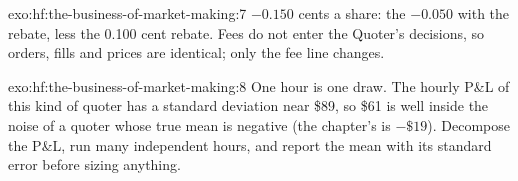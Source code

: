 \begin{solution}{exo:hf:the-business-of-market-making:7}
$-0.150$ cents a share: the $-0.050$ with the rebate, less the 0.100 cent rebate. Fees do not enter the Quoter's decisions, so orders, fills and
prices are identical; only the fee line changes.
\end{solution}

\begin{solution}{exo:hf:the-business-of-market-making:8}
One hour is one draw. The hourly P\&L of this kind of quoter has a standard deviation near \$89, so \$61 is well inside the noise of a quoter whose
true mean is negative (the chapter's is $-\$19$). Decompose the P\&L, run many independent hours, and report the mean with its standard error
before sizing anything.
\end{solution}


